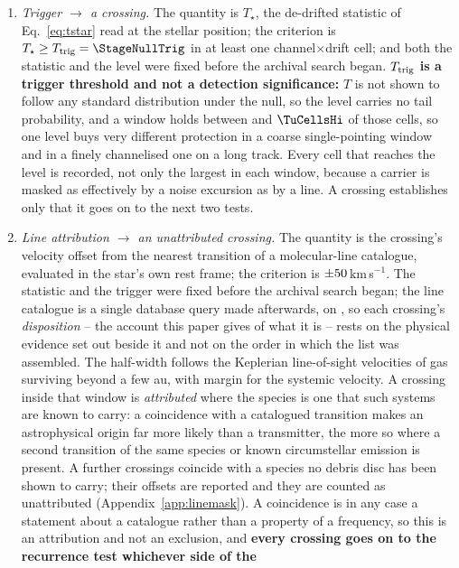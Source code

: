 \begin{enumerate}[label=(\roman*),leftmargin=1.9em,itemsep=3pt,topsep=3pt,parsep=0pt]
\item \emph{Trigger $\to$ a crossing.} The quantity is $T_\star$, the
de-drifted statistic of Eq.~\ref{eq:tstar} read at the stellar position; the
criterion is $T_\star\geq T_{\rm trig}=\StageNullTrig$ in at least one
channel$\times$drift cell; and both the statistic and the level were fixed
before the archival search began. \textbf{$T_{\rm trig}$ is a trigger
threshold and not a detection significance:} $T$ is not shown to follow any
standard distribution under the null, so the level carries no tail
probability, and a window holds between \TuCellsLo{} and $\TuCellsHi$ of
those cells, so one level buys very different protection in a coarse
single-pointing window and in a finely channelised one on a long track. Every
cell that reaches the level is recorded, not only the largest in each window,
because a carrier is masked as effectively by a noise excursion as by a line.
A crossing establishes only that it goes on to the next two tests.
\item \emph{Line attribution $\to$ an unattributed crossing.} The quantity
is the crossing's velocity offset from the nearest transition of a
molecular-line catalogue, evaluated in the star's own rest frame; the
criterion is $\pm50$\,km\,s$^{-1}$. The statistic and the trigger
were fixed before the archival search began; the line catalogue is a single database query made afterwards, on
\MkListDate, so each crossing's \emph{disposition} -- the account this paper
gives of what it is -- rests on the physical evidence set out beside it and
not on the order in which the list was assembled. The half-width follows the Keplerian line-of-sight
velocities of gas
surviving beyond a few au, with margin for the systemic velocity. A crossing
inside that window is \emph{attributed} where the species is one that such
systems are known to carry: a coincidence with a catalogued transition makes
an astrophysical origin far more likely than a transmitter, the more so
where a second transition of the same species or known circumstellar
emission is present. A further \MkNSODecideWord{} crossings coincide with a
species no debris disc has been shown to carry; their offsets are reported
and they are counted as unattributed (Appendix~\ref{app:linemask}).
A coincidence is in any case a statement about a catalogue rather than a
property of a frequency, so this is an attribution and not an exclusion, and
\textbf{every crossing goes on to the recurrence test whichever side of the
}
\end{enumerate}
